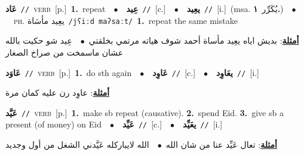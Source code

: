 \documentclass[10pt,a4paper,twoside]{article} %
\begin{document}
\begin{multicols}{2}
{\setlength\topsep{0pt}\textbf{\foreignlanguage{arabic}{عَاد}}\ {\color{gray}\texttt{//}\color{black}}\ \textsc{verb}\ [p.]\ \textbf{1.}~repeat\ \ $\bullet$\ \ \setlength\topsep{0pt}\textbf{\foreignlanguage{arabic}{عِيد}}\ {\color{gray}\texttt{//}\color{black}}\ [c.]\ \ $\bullet$\ \ \setlength\topsep{0pt}\textbf{\foreignlanguage{arabic}{يعِيد}}\ {\color{gray}\texttt{//}\color{black}}\ [i.]\ \color{gray}(msa. \foreignlanguage{arabic}{يُكَرِّر}~\foreignlanguage{arabic}{\textbf{١.}})\color{black}\ \ $\bullet$\ \ \textsc{ph.} \color{gray} \foreignlanguage{arabic}{يعِيد مأسَاة}\color{black}\ {\color{gray}\texttt{/{\sffamily jʕiːd maʔsaːt}/}\color{black}}\ \textbf{1.}~repeat the same mistake\  \begin{flushright}\color{gray}\foreignlanguage{arabic}{\textbf{\underline{\foreignlanguage{arabic}{أمثلة}}}: بديش اياه يعِيد مأساة أحمد شوف هياته مرتمي بخلقتي\ $\bullet$\ \  عِيد شو حكيت بالله عشان ماسمخت من صراخ الصغار}\end{flushright}\color{black}} \vspace{2mm}

{\setlength\topsep{0pt}\textbf{\foreignlanguage{arabic}{عَاوَد}}\ {\color{gray}\texttt{//}\color{black}}\ \textsc{verb}\ [p.]\ \textbf{1.}~do sth again\ \ $\bullet$\ \ \setlength\topsep{0pt}\textbf{\foreignlanguage{arabic}{عَاوِد}}\ {\color{gray}\texttt{//}\color{black}}\ [c.]\ \ $\bullet$\ \ \setlength\topsep{0pt}\textbf{\foreignlanguage{arabic}{يعَاوِد}}\ {\color{gray}\texttt{//}\color{black}}\ [i.]\  \begin{flushright}\color{gray}\foreignlanguage{arabic}{\textbf{\underline{\foreignlanguage{arabic}{أمثلة}}}: عاوِد رن عليه كمان مرة}\end{flushright}\color{black}} \vspace{2mm}

{\setlength\topsep{0pt}\textbf{\foreignlanguage{arabic}{عَيَّد}}\ {\color{gray}\texttt{//}\color{black}}\ \textsc{verb}\ [p.]\ \textbf{1.}~make sb repeat (causative).  \textbf{2.}~spend Eid.  \textbf{3.}~give sb a present (of money) on Eid\ \ $\bullet$\ \ \setlength\topsep{0pt}\textbf{\foreignlanguage{arabic}{عَيِّد}}\ {\color{gray}\texttt{//}\color{black}}\ [c.]\ \ $\bullet$\ \ \setlength\topsep{0pt}\textbf{\foreignlanguage{arabic}{يعَيِّد}}\ {\color{gray}\texttt{//}\color{black}}\ [i.]\  \begin{flushright}\color{gray}\foreignlanguage{arabic}{\textbf{\underline{\foreignlanguage{arabic}{أمثلة}}}: تعال عَيِّد عنا من شان الله\ $\bullet$\ \  الله لايباركله عَيَّدني الشغل من أول وجديد}\end{flushright}\color{black}} \vspace{2mm}


\end{multicols}
\end{document}
